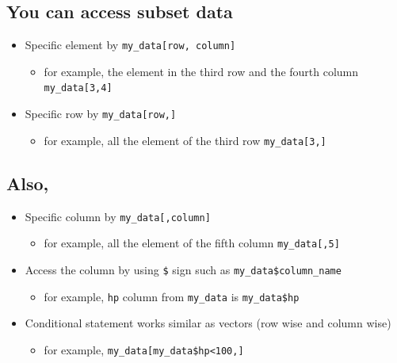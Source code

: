 \documentclass[
]{article}
\providecommand{\tightlist}{%
  \setlength{\itemsep}{0pt}\setlength{\parskip}{0pt}}
\begin{document}
\subsection{You can access subset
data}\label{you-can-access-subset-data}

\begin{itemize}
\item
  Specific element by \texttt{my\_data{[}row,\ column{]}}

  \begin{itemize}
  \tightlist
  \item
    \textbar{} for example, the element in the third row and the fourth
    column \texttt{my\_data{[}3,4{]}}
  \end{itemize}
\item
  Specific row by \texttt{my\_data{[}row,{]}}

  \begin{itemize}
  \tightlist
  \item
    \textbar{} for example, all the element of the third row
    \texttt{my\_data{[}3,{]}}
  \end{itemize}
\end{itemize}

\subsection{Also,}\label{also}

\begin{itemize}
\item
  Specific column by \texttt{my\_data{[},column{]}}

  \begin{itemize}
  \tightlist
  \item
    \textbar{} for example, all the element of the fifth column
    \texttt{my\_data{[},5{]}}
  \end{itemize}
\item
  Access the column by using \texttt{\$} sign such as
  \texttt{my\_data\$column\_name}

  \begin{itemize}
  \tightlist
  \item
    \textbar{} for example, \texttt{hp} column from \texttt{my\_data} is
    \texttt{my\_data\$hp}
  \end{itemize}
\item
  Conditional statement works similar as vectors (row wise and column
  wise)

  \begin{itemize}
  \tightlist
  \item
    \textbar{} for example,
    \texttt{my\_data{[}my\_data\$hp\textless{}100,{]}}
  \end{itemize}
\end{itemize}
\end{document}
